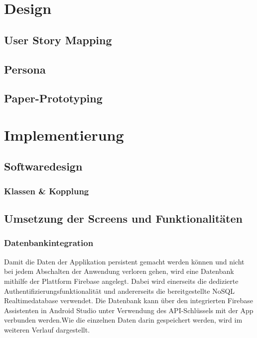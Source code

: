 \documentclass[12pt, a4paper, oneside]{article}
\begin{document}
\section{Design}
\subsection{User Story Mapping}
\subsection{Persona}
\subsection{Paper-Prototyping}

\section{Implementierung}
\subsection{Softwaredesign}
\subsubsection{Klassen \& Kopplung}
\subsection{Umsetzung der Screens und Funktionalitäten}
\subsubsection{Datenbankintegration}
Damit die Daten der Applikation persistent gemacht werden können und nicht bei jedem Abschalten der Anwendung verloren gehen, wird eine Datenbank mithilfe der Plattform Firebase angelegt. Dabei wird einerseits die dedizierte Authentifizierungsfunktionalität und andererseits die bereitgestellte NoSQL Realtimedatabase verwendet. Die Datenbank kann über den integrierten Firebase Assistenten in Android Studio unter Verwendung des API-Schlüssels mit der App verbunden werden.Wie die einzelnen Daten darin gespeichert werden, wird im weiteren Verlauf dargestellt.\\
\end{document}
